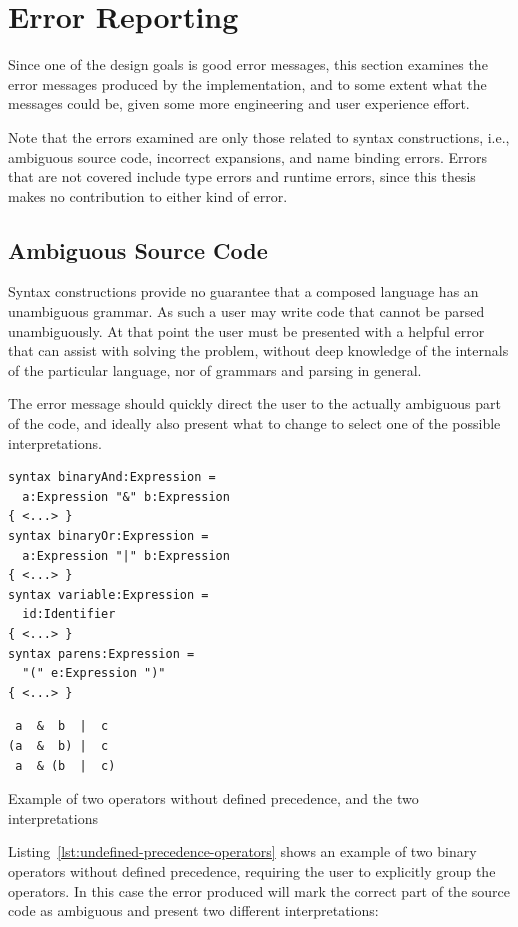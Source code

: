 \documentclass{kththesis}
\begin{document}
\section{Error Reporting} \label{sec:error-reporting}

Since one of the design goals is good error messages, this section examines the error messages produced by the implementation, and to some extent what the messages could be, given some more engineering and user experience effort.

Note that the errors examined are only those related to syntax constructions, i.e., ambiguous source code, incorrect expansions, and name binding errors. Errors that are not covered include type errors and runtime errors, since this thesis makes no contribution to either kind of error.

\subsection{Ambiguous Source Code} \label{sec:errors-ambiguous}

Syntax constructions provide no guarantee that a composed language has an unambiguous grammar. As such a user may write code that cannot be parsed unambiguously. At that point the user must be presented with a helpful error that can assist with solving the problem, without deep knowledge of the internals of the particular language, nor of grammars and parsing in general.

The error message should quickly direct the user to the actually ambiguous part of the code, and ideally also present what to change to select one of the possible interpretations.

\begin{listing}[t]
\begin{verbatim}
syntax binaryAnd:Expression =
  a:Expression "&" b:Expression
{ <...> }
syntax binaryOr:Expression =
  a:Expression "|" b:Expression
{ <...> }
syntax variable:Expression =
  id:Identifier
{ <...> }
syntax parens:Expression =
  "(" e:Expression ")"
{ <...> }
\end{verbatim}
\begin{verbatim}
 a  &  b  |  c
(a  &  b) |  c
 a  & (b  |  c)
\end{verbatim}
\caption{Example of two operators without defined precedence, and the two interpretations}
\label{lst:undefined-precedence-operators}
\end{listing}

Listing~\ref{lst:undefined-precedence-operators} shows an example of two binary operators without defined precedence, requiring the user to explicitly group the operators. In this case the error produced will mark the correct part of the source code as ambiguous and present two different interpretations:
\end{document}
